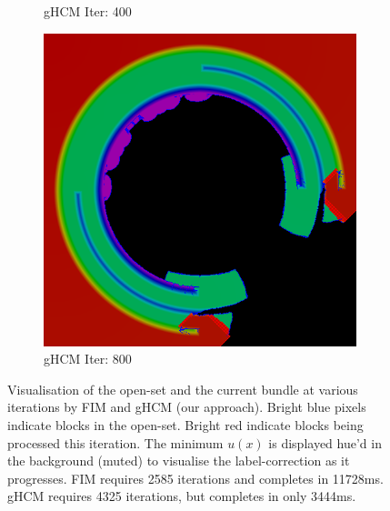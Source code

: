 \documentclass[11pt]{article}       %
\begin{document}
\begin{figure}
\begin{subfigure}[b]{.3\columnwidth}
	\caption{gHCM Iter: 400}
\end{subfigure}
\begin{subfigure}[b]{.3\columnwidth}
	\includegraphics[width=\textwidth]{Figures/iter_800_ghcm}
	\caption{gHCM Iter: 800}
\end{subfigure}

\caption{Visualisation of the open-set and the current bundle at various iterations by FIM and gHCM (our approach). Bright blue pixels indicate blocks in the open-set. Bright red indicate blocks being processed this iteration. The minimum $u(x)$ is displayed hue'd in the background (muted) to visualise the label-correction as it progresses. FIM requires 2585 iterations and completes in 11728ms. gHCM requires 4325 iterations, but completes in only 3444ms.}
\label{fig:7_ring_4096_open_set}
\end{figure}
\end{document}
